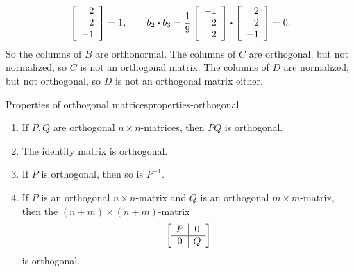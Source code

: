 \documentclass{ximera}
\begin{document}
\begin{solution}
\begin{equation*}
    \startmat{r} 2 \\ 2 \\ -1 \stopmat
    = 1,\qquad
    \vect{b}_2\dotprod \vect{b}_3 =
    \frac{1}{9}
    \startmat{r} -1 \\ 2 \\ 2 \stopmat
    \dotprod
    \startmat{r} 2 \\ 2 \\ -1 \stopmat
    = 0.
  \end{equation*}
  So the columns of $B$ are orthonormal.  The columns of $C$ are
  orthogonal, but not normalized, so $C$ is not an orthogonal
  matrix. The columns of $D$ are normalized, but not orthogonal, so
  $D$ is not an orthogonal matrix either.
\end{solution}

\begin{proposition}{Properties of orthogonal matrices}{properties-orthogonal}

  \begin{enumerate}
  \item\label{item:properties-orthogonal-a}
    If $P,Q$ are orthogonal $n\times n$-matrices, then $PQ$ is
    orthogonal.
  \item The identity matrix is orthogonal.
  \item If $P$ is orthogonal, then so is $P^{-1}$.
  \item\label{item:properties-orthogonal-d}
    If $P$ is an orthogonal $n\times n$-matrix and $Q$ is an
    orthogonal $m\times m$-matrix, then the $(n+m)\times(n+m)$-matrix
    \begin{equation*}
      \startmat{c|c}
        P & 0 \\\hline
        0 & Q
      \stopmat
    \end{equation*}
    is orthogonal.
    \end{enumerate}

\end{proposition}
\end{document}
